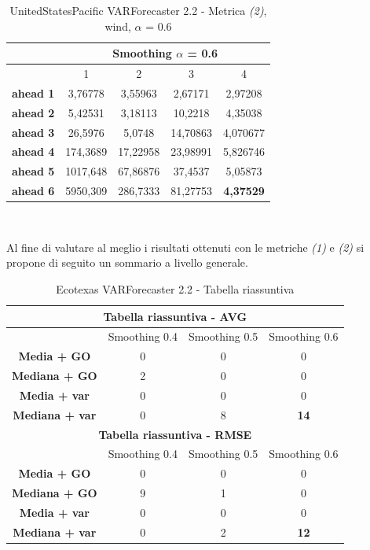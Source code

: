 \documentclass[12pt,a4paper,oneside,openright]{book}
\begin{document}
\medskip

\begin{table}[H]
\centering
\begin{tabular}{|c|c|c|c|c|}
\hline
 & \multicolumn{4}{|c|}{Smoothing $\alpha$ = 0.6} \\
\hline
& 1 & 2 & 3 & 4 \\
\hline
\textbf{ahead 1} & 3,76778 & 3,55963 & 2,67171 & 2,97208 \\
\hline
\textbf{ahead 2} & 5,42531 & 3,18113 & 10,2218 & 4,35038\\ 
\hline
\textbf{ahead 3} & 26,5976 & 5,0748 & 14,70863 & 4,070677 \\
\hline
\textbf{ahead 4} & 174,3689 & 17,22958 & 23,98991 & 5,826746\\ 
\hline
\textbf{ahead 5} & 1017,648 & 67,86876 & 37,4537 & 5,05873\\
\hline
\textbf{ahead 6} & 5950,309 & 286,7333 & 81,27753 & \textbf{4,37529}\\ 
\hline
\end{tabular} \\
\caption{UnitedStatesPacific VARForecaster 2.2 - Metrica \textit{(2)}, wind, $\alpha$ = 0.6}
\end{table}

Al fine di valutare al meglio i risultati ottenuti con le metriche \textit{(1)} e \textit{(2)} si propone di seguito un sommario a livello generale.

\begin{table}[H]
\centering
\begin{tabular}{|c|c|c|c|}
\hline
\multicolumn{4}{|c|}{\textbf{Tabella riassuntiva - AVG}} \\
\hline
& Smoothing 0.4 & Smoothing 0.5 & Smoothing 0.6 \\
\hline
\textbf{Media + GO} & 0 & 0 & 0\\ 
\hline
\textbf{Mediana + GO} & 2 & 0 & 0\\ 
\hline
\textbf{Media + var} & 0 & 0 & 0\\ 
\hline
\textbf{Mediana + var} & 0 & 8 & \textbf{14}\\ 
\hline
\multicolumn{4}{|c|}{\textbf{Tabella riassuntiva - RMSE}} \\
\hline
& Smoothing 0.4 & Smoothing 0.5 & Smoothing 0.6 \\
\hline
\textbf{Media + GO} & 0 & 0 & 0\\ 
\hline
\textbf{Mediana + GO} & 9 & 1 & 0\\ 
\hline
\textbf{Media + var} & 0 & 0 & 0 \\ 
\hline
\textbf{Mediana + var} & 0 & 2 & \textbf{12}\\ 
\hline
\end{tabular} \\
\caption{Ecotexas VARForecaster 2.2 - Tabella riassuntiva}
\end{table}
\end{document}
